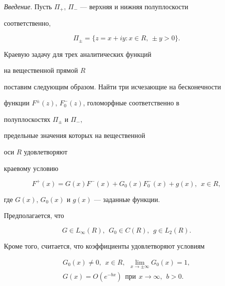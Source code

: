 

\maketitle


\label{begin}








{\it Введение}. Пусть $\Pi_+$, $\Pi_-$ --- верхняя и нижняя полуплоскости


соответственно,


$$


\Pi_\pm=\{z=x+iy :  x\in R,\ \pm y>0\}.


$$


Краевую задачу для трех аналитических функций


на вещественной прямой $R$


поставим следующим образом. Найти три исчезающие на бесконечности


функции $F^\pm(z)$, $F_0^-(z)$, голоморфные соответственно в


полуплоскостях $\Pi_\pm$ и $\Pi_-$,


предельные значения которых на вещественной


оси $R$ удовлетворяют


краевому условию


\begin{equation}


F^+(x)=G(x)F^-(x)+ G_0(x)F_0^-(x)+ g(x),\ \ x\in R,


\end{equation}


где $G(x)$, $G_0(x)$ и $g(x)$ --- заданные функции.





Предполагается, что


\begin{equation}


G\in L_\infty (R),\ \ G_0\in C(R),\ \ g\in L_2(R). 


\end{equation}


Кроме того, считается, что коэффициенты удовлетворяют условиям


\begin{gather}


G_0(x)\neq 0,\ \ x\in R,\ \ \lim_{x\to \pm \infty}G_0(x)=1,\\


G(x)=O(e^{-bx})\ \ \text{при}\ \ x\to \infty,\ \ b>0.


\end{gather}





